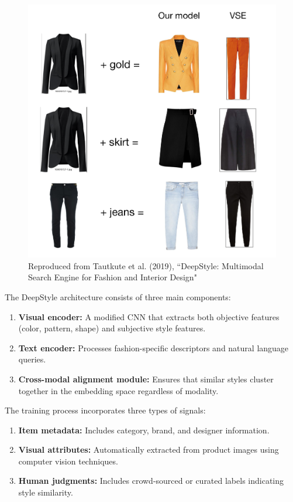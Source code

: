 \documentclass[conference]{IEEEtran}
\begin{document}
\begin{enumerate}
\begin{figure}
    \centering
    \includegraphics[width=0.56\linewidth]{images/image3.png}
    \caption{Reproduced from Tautkute et al. (2019), “DeepStyle: Multimodal Search Engine
for Fashion and Interior Design"}
    \label{fig:enter-label}
\end{figure}

The DeepStyle architecture consists of three main components:

\begin{enumerate}
    \item \textbf{Visual encoder:} A modified CNN that extracts both objective features (color, pattern, shape) and subjective style features.
    \item \textbf{Text encoder:} Processes fashion-specific descriptors and natural language queries.
    \item \textbf{Cross-modal alignment module:} Ensures that similar styles cluster together in the embedding space regardless of modality.
\end{enumerate}

The training process incorporates three types of signals:

\begin{enumerate}
    \item \textbf{Item metadata:} Includes category, brand, and designer information.
    \item \textbf{Visual attributes:} Automatically extracted from product images using computer vision techniques.
    \item \textbf{Human judgments:} Includes crowd-sourced or curated labels indicating style similarity.
\end{enumerate}


\end{enumerate}
\end{document}
